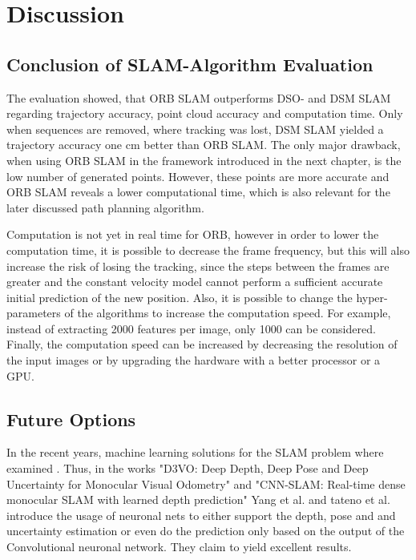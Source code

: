 \section{Discussion}

\subsection{Conclusion of SLAM-Algorithm Evaluation}

	The evaluation showed, that ORB SLAM outperforms DSO- and DSM SLAM regarding trajectory accuracy, point cloud accuracy and computation time. 
	Only when sequences are removed, where tracking was lost, DSM SLAM yielded a trajectory accuracy one cm better than ORB SLAM. The only major 
	drawback, when using ORB SLAM in the framework introduced in the next chapter, is the low number of generated points. However, these 
	points are more accurate and ORB SLAM reveals a lower computational time, which is also relevant for the later discussed path planning algorithm. 

	Computation is not yet in real time for ORB, however in order to lower the computation time, it is possible to decrease the frame 
	frequency, but this will also increase the risk of losing the tracking, since the steps between the frames are greater and 
	the constant velocity model cannot perform a sufficient accurate initial  prediction of the new position. Also, it is possible to change the hyper-parameters of 
	the algorithms to increase the computation speed. For example, instead of extracting 2000 features per image, 
	only 1000 can be considered. Finally, the computation speed can be increased by decreasing the resolution of the input images 
	or by upgrading the hardware with a better processor or a GPU. 

\subsection{Future Options}

In the recent years, machine learning solutions for the SLAM problem where examined \cite{cnnslam2} \cite{deepslam}. Thus, in the works "D3VO: Deep Depth, Deep Pose and Deep Uncertainty
for Monocular Visual Odometry" \cite{deepslam} and "CNN-SLAM: Real-time dense monocular SLAM with learned depth prediction" \cite{cnnslam2} Yang et al.
 and tateno et al. introduce the usage of neuronal nets to either support the depth, pose and and uncertainty estimation or even do the prediction only based on 
 the output of the Convolutional neuronal network. They claim to yield excellent results.

